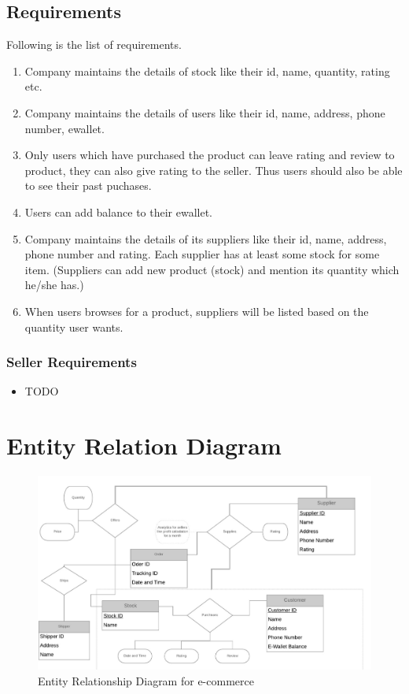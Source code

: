 \documentclass[a4paper,12pt]{article}
\begin{document}
\subsection{Requirements}
Following is the list of requirements.
\begin{enumerate}
  \item Company maintains the details of stock like their id, name, quantity, rating etc.

  \item Company maintains the details of users like their id, name, address, phone number, ewallet.

  \item Only users which have purchased the product can leave rating and review to product, they can also give rating to the seller. Thus users should also be able to see their past puchases.

  \item Users can add balance to their ewallet.

  \item Company maintains the details of its suppliers like their id, name, address, phone number and rating. Each supplier has at least some stock for some item. (Suppliers can add new product (stock) and mention its quantity which he/she has.)

  \item When users browses for a product, suppliers will be listed based on the quantity user wants.
\end{enumerate}
\subsubsection{Seller Requirements}

\begin{itemize}
  \item TODO
\end{itemize}

\section{Entity Relation Diagram}
\begin{figure}[H]
    \centering
    \includegraphics[width=1\textwidth]{ERD2} 
    \caption{Entity Relationship Diagram for e-commerce}
\end{figure}
\end{document}
